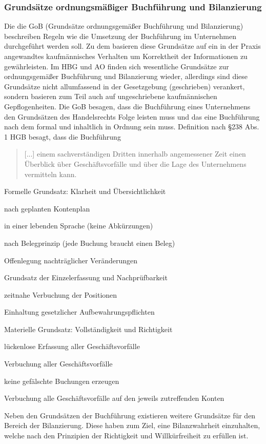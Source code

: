 \subsubsection{Grundsätze ordnungsmäßiger Buchführung und Bilanzierung}
Die die GoB (Grundsätze ordnungsgemäßer Buchführung und Bilanzierung) beschreiben Regeln wie die Umsetzung der Buchführung im Unternehmen durchgeführt werden soll. Zu dem basieren diese Grundsätze auf ein in der Praxis angewandtes kaufmännisches Verhalten um Korrektheit der Informationen zu gewährleisten. Im HBG und AO finden sich wesentliche Grundsätze zur ordnungsgemäßer Buchführung und Bilanzierung wieder, allerdings sind diese Grundsätze nicht allumfassend in der Gesetzgebung (geschrieben) verankert, sondern basieren zum Teil auch auf ungeschriebene kaufmännischen Gepflogenheiten. Die GoB besagen, dass die Buchführung eines Unternehmens den Grundsätzen des Handelsrechts Folge leisten muss und das eine Buchführung nach dem formal und inhaltlich in Ordnung sein muss. 
Definition nach §238 Abs. 1 HGB besagt, dass die Buchführung \begin{quote}[...] einem sachverständigen Dritten innerhalb angemessener Zeit einen Überblick über Geschäftsvorfälle und über die Lage des Unternehmens vermitteln kann.\end{quote}

Formelle Grundsatz: Klarheit und Übersichtlichkeit
\begin{compactitem} 
\item  nach geplanten Kontenplan
\item  in einer lebenden Sprache (keine Abkürzungen)
\item  nach Belegprinzip (jede Buchung braucht einen Beleg)
\item  Offenlegung nachträglicher Veränderungen
\item  Grundsatz der Einzelerfassung und Nachprüfbarkeit
\item  zeitnahe Verbuchung der Positionen
\item  Einhaltung gesetzlicher Aufbewahrungspflichten
\end{compactitem}

Materielle Grundsatz: Vollständigkeit und Richtigkeit
\begin{compactitem}
\item  lückenlose Erfassung aller Geschäftsvorfälle
\item  Verbuchung aller Geschäftsvorfälle
\item  keine gefälschte Buchungen erzeugen
\item  Verbuchung alle Geschäftsvorfälle auf den jeweils zutreffenden Konten
\end{compactitem}
Neben den Grundsätzen der Buchführung existieren weitere Grundsätze für den Bereich der Bilanzierung. Diese haben zum Ziel, eine Bilanzwahrheit einzuhalten, welche nach den Prinzipien der Richtigkeit und Willkürfreiheit zu erfüllen ist. 

